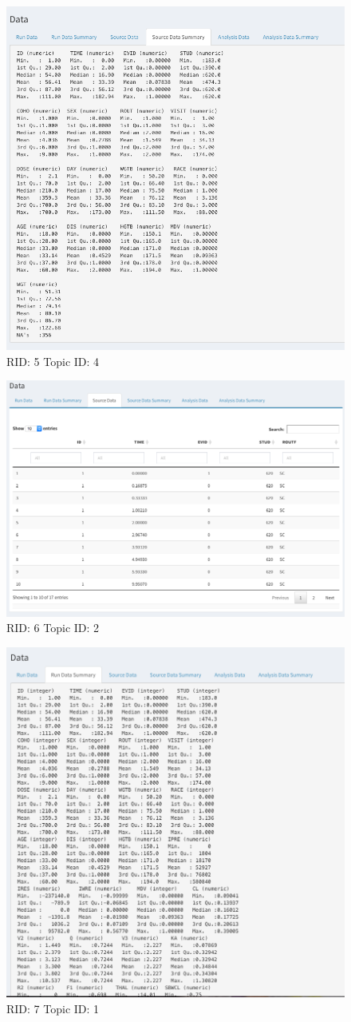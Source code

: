 \documentclass{article}
\begin{document}
\begin{figure}[hp]
\includegraphics[width=.8\textwidth]{screencaps/5-4-1.png}
\caption{RID: 5 Topic ID: 4}
\end{figure}
\newpage
\begin{figure}[hp]
\includegraphics[width=.8\textwidth]{screencaps/6-2-1.png}
\caption{RID: 6 Topic ID: 2}
\end{figure}
\newpage
\begin{figure}[hp]
\includegraphics[width=.8\textwidth]{screencaps/7-1-1.png}
\caption{RID: 7 Topic ID: 1}
\end{figure}
\end{document}
